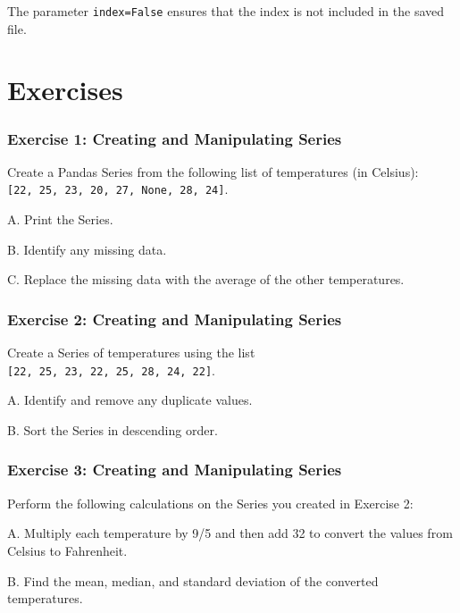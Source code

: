 \documentclass[
  letterpaper,
  DIV=11,
  numbers=noendperiod]{scrreprt}
\begin{document}
The parameter \texttt{index=False} ensures that the index is not
included in the saved file.

\hypertarget{exercises-10}{%
\section{Exercises}\label{exercises-10}}

\hypertarget{exercise-1-creating-and-manipulating-series}{%
\subsubsection{Exercise 1: Creating and Manipulating
Series}\label{exercise-1-creating-and-manipulating-series}}

Create a Pandas Series from the following list of temperatures (in
Celsius): \texttt{{[}22,\ 25,\ 23,\ 20,\ 27,\ None,\ 28,\ 24{]}}.

A. Print the Series.

B. Identify any missing data.

C. Replace the missing data with the average of the other temperatures.

\hypertarget{exercise-2-creating-and-manipulating-series}{%
\subsubsection{Exercise 2: Creating and Manipulating
Series}\label{exercise-2-creating-and-manipulating-series}}

Create a Series of temperatures using the list
\texttt{{[}22,\ 25,\ 23,\ 22,\ 25,\ 28,\ 24,\ 22{]}}.

A. Identify and remove any duplicate values.

B. Sort the Series in descending order.

\hypertarget{exercise-3-creating-and-manipulating-series}{%
\subsubsection{Exercise 3: Creating and Manipulating
Series}\label{exercise-3-creating-and-manipulating-series}}

Perform the following calculations on the Series you created in Exercise
2:

A. Multiply each temperature by 9/5 and then add 32 to convert the
values from Celsius to Fahrenheit.

B. Find the mean, median, and standard deviation of the converted
temperatures.
\end{document}
